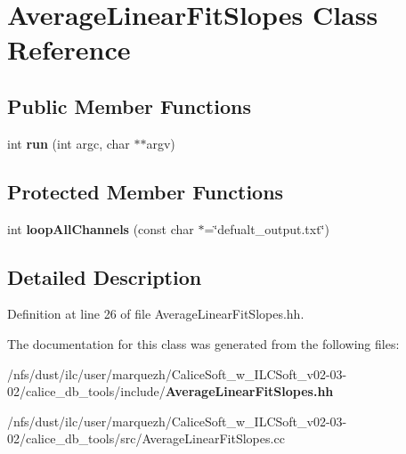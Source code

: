 \section{Average\-Linear\-Fit\-Slopes Class Reference}
\label{classAverageLinearFitSlopes}
\subsection*{Public Member Functions}
\begin{DoxyCompactItemize}
\item 
int {\bfseries run} (int argc, char $\ast$$\ast$argv)\label{classAverageLinearFitSlopes_a3361f7c71a9ef79c5126d97f422d556a}

\end{DoxyCompactItemize}
\subsection*{Protected Member Functions}
\begin{DoxyCompactItemize}
\item 
int {\bfseries loop\-All\-Channels} (const char $\ast$=\char`\"{}defualt\-\_\-output.\-txt\char`\"{})\label{classAverageLinearFitSlopes_a732fbf6884ec51afc23aa683b150dcef}

\end{DoxyCompactItemize}


\subsection{Detailed Description}


Definition at line 26 of file Average\-Linear\-Fit\-Slopes.\-hh.



The documentation for this class was generated from the following files\-:\begin{DoxyCompactItemize}
\item 
/nfs/dust/ilc/user/marquezh/\-Calice\-Soft\-\_\-w\-\_\-\-I\-L\-C\-Soft\-\_\-v02-\/03-\/02/calice\-\_\-db\-\_\-tools/include/{\bf Average\-Linear\-Fit\-Slopes.\-hh}\item 
/nfs/dust/ilc/user/marquezh/\-Calice\-Soft\-\_\-w\-\_\-\-I\-L\-C\-Soft\-\_\-v02-\/03-\/02/calice\-\_\-db\-\_\-tools/src/Average\-Linear\-Fit\-Slopes.\-cc\end{DoxyCompactItemize}
